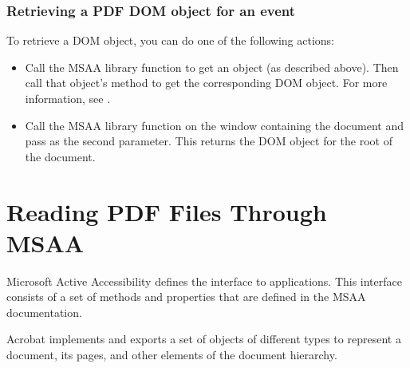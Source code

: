 \documentclass[letterpaper,12pt,english,openany,oneside]{sphinxmanual}
\begin{document}
\subsection{Retrieving a PDF DOM object for an event}
\label{\detokenize{index:retrieving-a-pdf-dom-object-for-an-event}}
To retrieve a DOM object, you can do one of the following actions:
\begin{itemize}
\item {} 
Call the MSAA library function  to get an  object (as described above). Then call that  object’s  method to get the corresponding DOM object. For more information, see .

\item {} 
Call the MSAA library function  on the window containing the document and pass  as the second parameter. This returns the DOM object for the root of the document.

\end{itemize}


\chapter{Reading PDF Files Through MSAA}
\label{\detokenize{MSAA_PDF:reading-pdf-files-through-msaa}}\label{\detokenize{MSAA_PDF::doc}}
Microsoft Active Accessibility defines the  interface to applications. This interface consists of a set of methods and properties that are defined in the MSAA documentation.

Acrobat implements and exports a set of  objects of different types to represent a document, its pages, and other elements of the document hierarchy.
\end{document}
